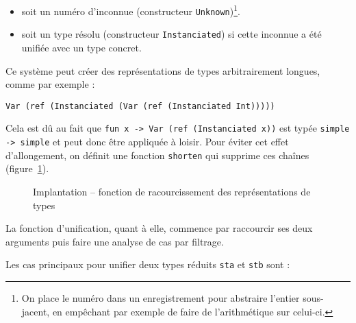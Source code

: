 \begin{itemize}
\item soit un numéro d'inconnue (constructeur \texttt{Unknown})\footnote{On
  place le numéro dans un enregistrement pour abstraire l'entier sous-jacent, en
  empêchant par exemple de faire de l'arithmétique sur celui-ci.}.

\item soit un type résolu (constructeur \texttt{Instanciated}) si cette
  inconnue a été unifiée avec un type concret.
\end{itemize}

Ce système peut créer des représentations de types arbitrairement longues, comme
par exemple :

\texttt{Var (ref (Instanciated (Var (ref (Instanciated Int)))))}

Cela est dû au fait que \texttt{fun x -> Var (ref (Instanciated x))} est typée
\texttt{simple -> simple} et peut donc être appliquée à loisir. Pour éviter cet
effet d'allongement, on définit une fonction \texttt{shorten} qui supprime ces
chaînes (figure~\ref{fig:implem-shorten}).


\begin{figure}


\caption{Implantation -- fonction de racourcissement des représentations de types}
\label{fig:implem-shorten}
\end{figure}

La fonction d'unification, quant à elle, commence par raccourcir ses deux
arguments puis faire une analyse de cas par filtrage.

Les cas principaux pour unifier deux types réduits \texttt{sta} et \texttt{stb}
sont :

